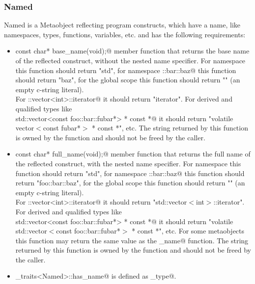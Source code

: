 \subsubsection{Named}

{\metaobject Named} is a {\metaobject Metaobject} reflecting program constructs,
which have a name, like namespaces, types, functions, variables, etc. and has
the following requirements:

\begin{itemize}

	\item{\verb@static const char* base_name(void);@} member function that returns the base name
	of the reflected construct, without the nested name specifier. For namespace
	\verb@std@ this function should return "std", for namespace \verb@foo::bar::baz@
	this function should return "baz", for the global scope this function
	should return "" (an empty c-string literal).\\For \verb@std::vector<int>::iterator@
	it should return "iterator". For derived and qualified types like \\
	\verb@volatile std::vector<const foo::bar::fubar*> * const *@ it should return
	"volatile vector$<$const fubar*$>$ * const *", etc. The string returned by this
	function is owned by the function and should not be freed by the caller.

	\item{\verb@static const char* full_name(void);@} member function that returns the full name
	of the reflected construct, with the nested name specifier. For namespace
	\verb@std@ this function should return "std", for namespace \verb@foo::bar::baz@
	this function should return "foo::bar::baz", for the global scope this function
	should return "" (an empty c-string literal).\\For \verb@std::vector<int>::iterator@
	it should return "std::vector$<$int$>$::iterator". For derived and qualified types like\\
	\verb@volatile std::vector<const foo::bar::fubar*> * const *@ it should return
	"volatile std::vector$<$const foo::bar::fubar*$>$ * const *", etc. For some
	metaobjects this function may return the same value as the \verb@base_name@ function.
	The string returned by this function is owned by the function and should not be freed by the caller.
	

	\item \verb@metaobject_traits<Named>::has_name@ is defined as \verb@true_type@.
\end{itemize}

